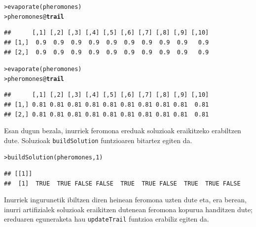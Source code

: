 \documentclass[eu]{ifirak}\usepackage[]{graphicx}\usepackage[]{color}
\makeatletter
\newcommand{\hlnum}[1]{\textcolor[rgb]{0.659,0.4,0.051}{#1}}%
\newcommand{\hlopt}[1]{\textcolor[rgb]{0,0,0}{#1}}%
\newcommand{\hlstd}[1]{\textcolor[rgb]{0,0,0}{#1}}%
\newcommand{\hlkwc}[1]{\textcolor[rgb]{0.659,0.573,0.133}{\textbf{#1}}}%
\newcommand{\hlkwd}[1]{\textcolor[rgb]{0.659,0.133,0.482}{#1}}%
\newenvironment{kframe}{%
 \def\at@end@of@kframe{}%
 \ifinner\ifhmode%
  \def\at@end@of@kframe{\end{minipage}}%
  \begin{minipage}{\columnwidth}%
 \fi\fi%
 \def\FrameCommand##1{\hskip\@totalleftmargin \hskip-\fboxsep
 \colorbox{shadecolor}{##1}\hskip-\fboxsep
     \hskip-\linewidth \hskip-\@totalleftmargin \hskip\columnwidth}%
 \MakeFramed {\advance\hsize-\width
   \@totalleftmargin\z@ \linewidth\hsize
   \@setminipage}}%
 {\par\unskip\endMakeFramed%
 \at@end@of@kframe}
\newenvironment{knitrout}{}{} %
\newcommand{\code}[1]{\texttt{#1}}
\makeatother
\begin{document}
\begin{knitrout}
\color{fgcolor}\begin{kframe}
\begin{alltt}
\hlstd{> }\hlkwd{evaporate}\hlstd{(pheromones)}
\hlstd{> }\hlstd{pheromones}\hlopt{@}\hlkwc{trail}
\end{alltt}
\begin{verbatim}
##      [,1] [,2] [,3] [,4] [,5] [,6] [,7] [,8] [,9] [,10]
## [1,]  0.9  0.9  0.9  0.9  0.9  0.9  0.9  0.9  0.9   0.9
## [2,]  0.9  0.9  0.9  0.9  0.9  0.9  0.9  0.9  0.9   0.9
\end{verbatim}
\begin{alltt}
\hlstd{> }\hlkwd{evaporate}\hlstd{(pheromones)}
\hlstd{> }\hlstd{pheromones}\hlopt{@}\hlkwc{trail}
\end{alltt}
\begin{verbatim}
##      [,1] [,2] [,3] [,4] [,5] [,6] [,7] [,8] [,9] [,10]
## [1,] 0.81 0.81 0.81 0.81 0.81 0.81 0.81 0.81 0.81  0.81
## [2,] 0.81 0.81 0.81 0.81 0.81 0.81 0.81 0.81 0.81  0.81
\end{verbatim}
\end{kframe}
\end{knitrout}

Esan dugun bezala, inurriek feromona ereduak soluzioak eraikitzeko erabiltzen dute. Soluzioak \code{buildSolution} funtzioaren bitartez egiten da.

\begin{knitrout}
\color{fgcolor}\begin{kframe}
\begin{alltt}
\hlstd{> }\hlkwd{buildSolution}\hlstd{(pheromones,} \hlnum{1}\hlstd{)}
\end{alltt}
\begin{verbatim}
## [[1]]
##  [1]  TRUE  TRUE FALSE FALSE  TRUE  TRUE FALSE  TRUE  TRUE FALSE
\end{verbatim}
\end{kframe}
\end{knitrout}

Inurriek ingurunetik ibiltzen diren heinean feromona uzten dute eta, era berean, inurri artifizialek soluzioak eraikitzen dutenean feromona kopurua handitzen dute; ereduaren eguneraketa hau \code{updateTrail} funtzioa erabiliz egiten da.
\end{document}
